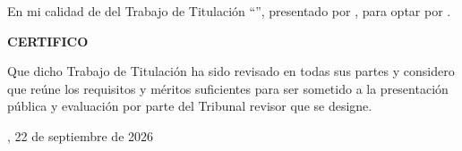 
En mi calidad de \UTITutorEtiqueta{} del Trabajo de Titulación ``\UTITituloProyectoMayusculas'', presentado por \UTIAutoresTexto, para optar por \UTIFraseTituloProfesional{}.

\begin{center}
\textbf{CERTIFICO}
\end{center}

Que dicho Trabajo de Titulación ha sido revisado en todas sus partes y considero que reúne los requisitos y méritos suficientes para ser sometido a la presentación pública y evaluación por parte del Tribunal revisor que se designe.

\vspace{1cm}

\UTICiudadPais, 22 de septiembre de 2026

\vspace{1cm}

\UTIFirmaTutorBloque